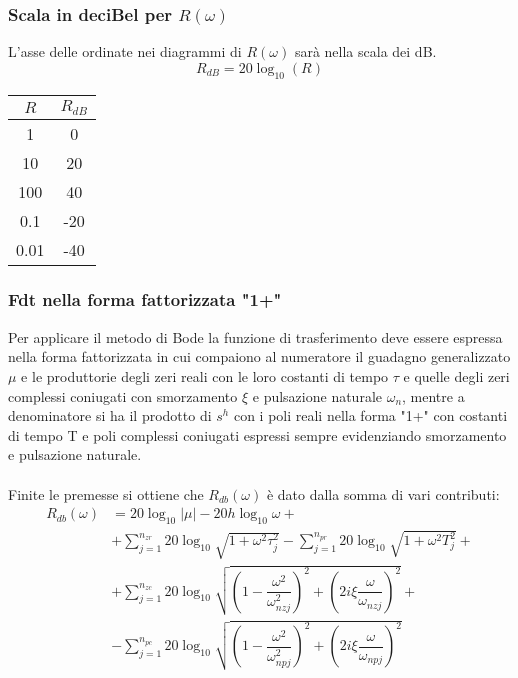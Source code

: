 \documentclass[a4paper]{article}
\begin{document}
	\subsubsection*{Scala in deciBel per $R(\omega)$}
	L'asse delle ordinate nei diagrammi di $R(\omega)$ sarà nella scala dei dB. \[R_{dB}=20\log_{10}(R)\]
	\begin{center}
	\begin{tabular}{c|c}
		
		$R$ & $R_{dB}$ \\
		\hline
		1 & 0\\
		10 & 20\\
		100 & 40\\
		0.1 & -20\\
		0.01 & -40
	\end{tabular}
	\end{center}
	
	\subsubsection*{Fdt nella forma fattorizzata "1+"}
	Per applicare il metodo di Bode la funzione di trasferimento deve essere espressa nella forma fattorizzata in cui compaiono al numeratore il guadagno generalizzato $\mu$ e le produttorie degli zeri reali con le loro costanti di tempo $\tau$ e quelle degli zeri complessi coniugati con smorzamento $\xi$ e pulsazione naturale $\omega_n$, mentre a denominatore si ha il prodotto di $s^h$ con i poli reali nella forma "1+" con costanti di tempo T e poli complessi coniugati espressi sempre evidenziando smorzamento e pulsazione naturale.
	\\\\
	Finite le premesse si ottiene che $R_{db}(\omega)$ è dato dalla somma di vari contributi:
	\begin{align*}
		R_{db}(\omega)&=20\log_{10}|\mu|-20h\log_{10}\omega+\\
		&+\sum_{j=1}^{n_{zr}}20\log_{10}\sqrt{1+\omega^2\tau_j^2}-\sum_{j=1}^{n_{pr}}20\log_{10}\sqrt{1+\omega^2T_j^2}+\\
		&+\sum_{j=1}^{n_{zc}}20\log_{10}\sqrt{\left(1-\dfrac{\omega^2}{\omega_{nzj}^2}\right)^2+\left(2i\xi\dfrac{\omega}{\omega_{nzj}}\right)^2}+\\
		&-\sum_{j=1}^{n_{pc}}20\log_{10}\sqrt{\left(1-\dfrac{\omega^2}{\omega_{npj}^2}\right)^2+\left(2i\xi\dfrac{\omega}{\omega_{npj}}\right)^2}
	\end{align*}
	
\end{document}
